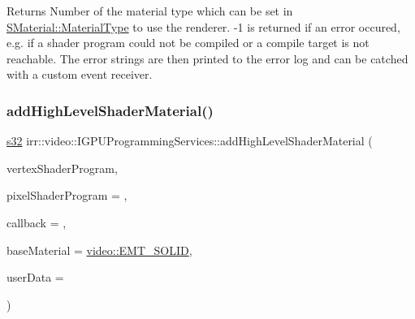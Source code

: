 \begin{DoxyReturn}{Returns}
Number of the material type which can be set in \hyperlink{classirr_1_1video_1_1SMaterial_a8cb63ab4b49ae1c61fbca8353e6b2f8a}{S\+Material\+::\+Material\+Type} to use the renderer. -\/1 is returned if an error occured, e.\+g. if a shader program could not be compiled or a compile target is not reachable. The error strings are then printed to the error log and can be catched with a custom event receiver. 
\end{DoxyReturn}
\mbox{\label{classirr_1_1video_1_1IGPUProgrammingServices_aeeecb11a1cab75912585b74e5329a593}} 
\subsubsection{\texorpdfstring{add\+High\+Level\+Shader\+Material()}{addHighLevelShaderMaterial()}\hspace{0.1cm}{\footnotesize\ttfamily [3/6]}}
{\footnotesize\ttfamily \hyperlink{namespaceirr_ac66849b7a6ed16e30ebede579f9b47c6}{s32} irr\+::video\+::\+I\+G\+P\+U\+Programming\+Services\+::add\+High\+Level\+Shader\+Material (\begin{DoxyParamCaption}\item[{const \hyperlink{namespaceirr_a9395eaea339bcb546b319e9c96bf7410}{c8} $\ast$}]{vertex\+Shader\+Program,  }\item[{const \hyperlink{namespaceirr_a9395eaea339bcb546b319e9c96bf7410}{c8} $\ast$}]{pixel\+Shader\+Program = {},  }\item[{\hyperlink{classirr_1_1video_1_1IShaderConstantSetCallBack}{I\+Shader\+Constant\+Set\+Call\+Back} $\ast$}]{callback = {},  }\item[{\hyperlink{namespaceirr_1_1video_ac8e9b6c66f7cebabd1a6d30cbc5430f1}{E\+\_\+\+M\+A\+T\+E\+R\+I\+A\+L\+\_\+\+T\+Y\+PE}}]{base\+Material = {\ttfamily \hyperlink{namespaceirr_1_1video_ac8e9b6c66f7cebabd1a6d30cbc5430f1aa0b13db05ac3b5f40e692769de202660}{video\+::\+E\+M\+T\+\_\+\+S\+O\+L\+ID}},  }\item[{\hyperlink{namespaceirr_ac66849b7a6ed16e30ebede579f9b47c6}{s32}}]{user\+Data = {} }\end{DoxyParamCaption})\hspace{0.3cm}{\ttfamily [inline]}}



